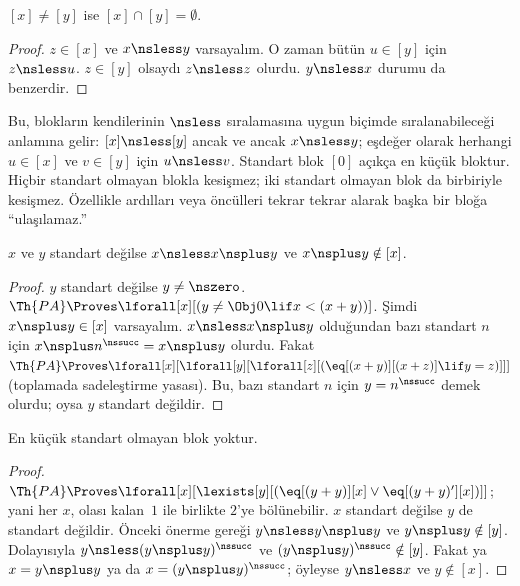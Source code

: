 \begin{cor}
$[x]\neq[y]$ ise $[x]\cap[y]=\emptyset$.
\end{cor}

\begin{proof}
$z\in[x]$ ve $x\nsless y$ varsayalım. O zaman bütün $u\in[y]$ için
$z\nsless u$. $z\in[y]$ olsaydı $z\nsless z$ olurdu. $y\nsless x$
durumu da benzerdir.
\end{proof}

\begin{explain}
Bu, blokların kendilerinin $\nsless$ sıralamasına uygun biçimde
sıralanabileceği anlamına gelir: $[x]\nsless[y]$ ancak ve ancak
$x\nsless y$; eşdeğer olarak herhangi $u\in[x]$ ve $v\in[y]$ için
$u\nsless v$. Standart blok $[0]$ açıkça en küçük bloktur. Hiçbir
standart olmayan blokla kesişmez; iki standart olmayan blok da
birbiriyle kesişmez. Özellikle ardılları veya öncülleri tekrar tekrar
alarak başka bir bloğa ``ulaşılamaz.''
\end{explain}

\begin{prop}
$x$ ve $y$ standart değilse $x\nsless x\nsplus y$ ve
$x\nsplus y\notin[x]$.
\end{prop}

\begin{proof}
$y$ standart değilse $y\neq\nszero$.
$\Th{PA}\Proves\lforall[x][(y\neq\Obj0\lif x<(x+y))]$. Şimdi
$x\nsplus y\in[x]$ varsayalım. $x\nsless x\nsplus y$ olduğundan bazı
standart $n$ için $x\nsplus n^\nssucc=x\nsplus y$ olurdu. Fakat
$\Th{PA}\Proves\lforall[x][\lforall[y][\lforall[z][
(\eq[(x+y)][(x+z)]\lif y=z)]]]$ (toplamada sadeleştirme yasası).
Bu, bazı standart $n$ için $y=n^\nssucc$ demek olurdu; oysa $y$
standart değildir.
\end{proof}

\begin{prop}
En küçük standart olmayan blok yoktur.
\end{prop}

\begin{proof}
$\Th{PA}\Proves\lforall[x][\lexists[y][(\eq[(y+y)][x]\lor
\eq[(y+y)'][x])]]$; yani her $x$, olası kalan~$1$ ile birlikte $2$'ye
bölünebilir. $x$ standart değilse $y$ de standart değildir. Önceki
önerme gereği $y\nsless y\nsplus y$ ve $y\nsplus y\notin[y]$.
Dolayısıyla $y\nsless(y\nsplus y)^\nssucc$ ve
$(y\nsplus y)^\nssucc\notin[y]$. Fakat ya $x=y\nsplus y$ ya da
$x=(y\nsplus y)^\nssucc$; öyleyse $y\nsless x$ ve $y\notin[x]$.
\end{proof}

